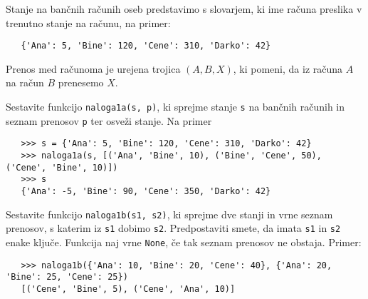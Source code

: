 \documentclass[arhiv]{izpit}
\begin{document}

\naloga[35 točk]

Stanje na bančnih računih oseb predstavimo s slovarjem, ki ime računa preslika v trenutno
stanje na računu, na primer:
%
{\small\begin{verbatim}
   {'Ana': 5, 'Bine': 120, 'Cene': 310, 'Darko': 42}
\end{verbatim}}\noindent
%
Prenos med računoma je urejena trojica $(A, B, X)$, ki pomeni, da iz računa $A$ na
račun $B$ prenesemo $X$.

\podnaloga[15 točk]
Sestavite funkcijo \verb|naloga1a(s, p)|, ki sprejme stanje \verb|s| na bančnih računih in seznam prenosov \verb|p| ter osveži stanje. Na primer
%
{\small\begin{verbatim}
   >>> s = {'Ana': 5, 'Bine': 120, 'Cene': 310, 'Darko': 42}
   >>> naloga1a(s, [('Ana', 'Bine', 10), ('Bine', 'Cene', 50), ('Cene', 'Bine', 10)])
   >>> s
   {'Ana': -5, 'Bine': 90, 'Cene': 350, 'Darko': 42}
\end{verbatim}}

\podnaloga[20 točk]
Sestavite funkcijo \verb|naloga1b(s1, s2)|, ki sprejme dve stanji in vrne seznam prenosov, s katerim iz \verb|s1| dobimo \verb|s2|. Predpostaviti smete, da imata \verb|s1| in \verb|s2| enake ključe. Funkcija naj vrne \verb|None|, če tak seznam prenosov ne obstaja.
Primer:
%
{\small\begin{verbatim}
   >>> naloga1b({'Ana': 10, 'Bine': 20, 'Cene': 40}, {'Ana': 20, 'Bine': 25, 'Cene': 25})
   [('Cene', 'Bine', 5), ('Cene', 'Ana', 10)]
\end{verbatim}}




\naloga[25 točk]
\end{document}
